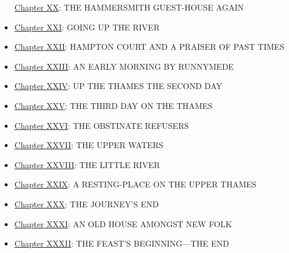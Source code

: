 \begin{itemize}
  \href{/wiki/News_from_Nowhere/Chapter_XX}{Chapter XX}: THE HAMMERSMITH
  GUEST-HOUSE AGAIN
\item
  \href{/wiki/News_from_Nowhere/Chapter_XXI}{Chapter XXI}: GOING UP THE
  RIVER
\item
  \href{/wiki/News_from_Nowhere/Chapter_XXII}{Chapter XXII}: HAMPTON
  COURT AND A PRAISER OF PAST TIMES
\item
  \href{/wiki/News_from_Nowhere/Chapter_XXIII}{Chapter XXIII}: AN EARLY
  MORNING BY RUNNYMEDE
\item
  \href{/wiki/News_from_Nowhere/Chapter_XXIV:_UP_THE_THAMES}{Chapter
  XXIV}: UP THE THAMES THE SECOND DAY
\item
  \href{/wiki/News_from_Nowhere/Chapter_XXV}{Chapter XXV}: THE THIRD DAY
  ON THE THAMES
\item
  \href{/wiki/News_from_Nowhere/Chapter_XXVI}{Chapter XXVI}: THE
  OBSTINATE REFUSERS
\item
  \href{/wiki/News_from_Nowhere/Chapter_XXVII}{Chapter XXVII}: THE UPPER
  WATERS
\item
  \href{/wiki/News_from_Nowhere/Chapter_XXVIII}{Chapter XXVIII}: THE
  LITTLE RIVER
\item
  \href{/wiki/News_from_Nowhere/Chapter_XXIX}{Chapter XXIX}: A
  RESTING-PLACE ON THE UPPER THAMES
\item
  \href{/wiki/News_from_Nowhere/Chapter_XXX}{Chapter XXX}: THE JOURNEY'S
  END
\item
  \href{/wiki/News_from_Nowhere/Chapter_XXXI}{Chapter XXXI}: AN OLD
  HOUSE AMONGST NEW FOLK
\item
  \href{/wiki/News_from_Nowhere/Chapter_XXXII}{Chapter XXXII}: THE
  FEAST'S BEGINNING---THE END
\end{itemize}
